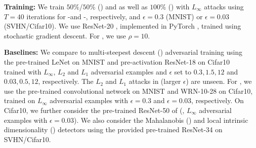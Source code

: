 \textbf{Training:}
%
We train $50\%$/$50\%$ \AdvTrain (\AdvTrainHalf) and \ConfTrain as well as $100\%$ \AdvTrain (\AdvTrainFull) with $L_\infty$ attacks using $T = 40$ iterations for \PGD-\FCE and \PGD-\FConf, respectively, and $\epsilon = 0.3$ (MNIST) or $\epsilon = 0.03$ (SVHN/Cifar10). We use ResNet-20 \citep{HeCVPR2016}, implemented in PyTorch \citep{PaszkeNIPSWORK2017}, trained using stochastic gradient descent. For \ConfTrain, we use $\rho = 10$.

\textbf{Baselines:}
%
We compare to multi-steepest descent (\Wong) adversarial training \cite{MainiICML2020} using the pre-trained LeNet on MNIST and pre-activation ResNet-18 on Cifar10 trained with $L_\infty$, $L_2$ and $L_1$ adversarial examples and $\epsilon$ set to $0.3, 1.5, 12$ and $0.03, 0.5, 12$, respectively. The $L_2$ and $L_1$ attacks in  (larger $\epsilon$) are unseen. For \TRADES \cite{ZhangICML2019}, we use the pre-trained convolutional network \cite{CarliniSP2017} on MNIST and WRN-10-28 \cite{ZagoruykoBMVC2016} on Cifar10, trained on $L_\infty$ adversarial examples with $\epsilon=0.3$ and $\epsilon=0.03$, respectively. On Cifar10, we further consider the pre-trained ResNet-50 of \cite{MadryICLR2018} (\MadryAT, $L_\infty$ adversarial examples with $\epsilon = 0.03$). We also consider the Mahalanobis (\Lee) \cite{LeeNIPS2018} and local intrinsic dimensionality (\Ma) detectors \cite{MaICLR2018} using the provided pre-trained ResNet-34 on SVHN/Cifar10.

